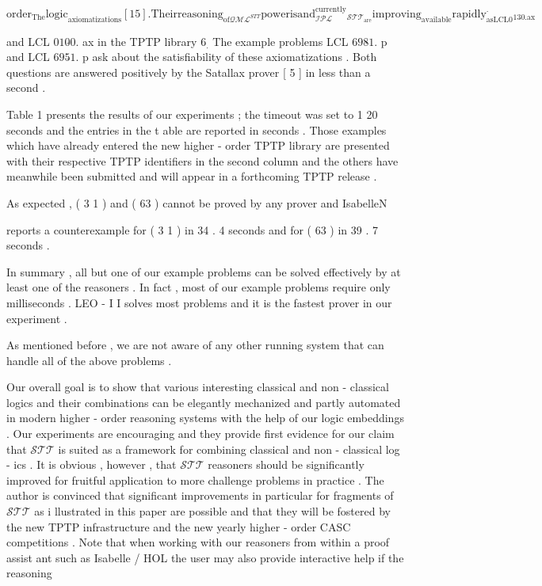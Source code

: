 \documentclass[10pt]{article}
\begin{document}
\[ \mathrm{order} _{ \mathrm{The} } \mathrm{logic} _{ \mathrm{axiomatizations} } [  1  5  ]  .   \mathrm{Their}   \mathrm{reasoning} _{ \mathrm{of}   \mathcal{QML} ^{ STT }} \mathrm{power}   \mathrm{is} { \mathrm{and} }_{ \mathcal{IPL} }^{ \mathrm{currently} }_{ \mathcal{STT} }_{ \mathrm{are} } \mathrm{improving} _{ \mathrm{available} } \mathrm{rapidly} _{ \mathrm{as}   \mathrm{LCL}  0 }^{ . }_{ 1  3  \hat{}  0  .  \mathrm{ax} }\]


\noindent and LCL  $ 0  1  0  \hat{}  0  . $  ax in the TPTP library  $ 6 _{ . }$  The example problems LCL  $ 698  \hat{}   1  . $  p and 
 LCL  $ 695  \hat{}  1  . $  p ask about the satisfiability of these axiomatizations . Both questions 
 are answered positively by the Satallax prover [ 5 ] in less than a second . 

Table 1 presents the results of our experiments ; the timeout was set to 1 20 
 seconds and the entries in the t able are reported in seconds . Those examples 
 which have already entered the new higher - order TPTP library are presented 
 with their respective TPTP identifiers in the second column and the others have 
 meanwhile been submitted and will appear in a forthcoming TPTP release . 

\hspace*{\fill}As expected , \quad ( 3 1 ) and ( 63 ) cannot be proved by any prover and IsabelleN 

\noindent reports a counterexample for ( 3 1 ) in 34 . 4 seconds and for ( 63 ) in 39 . 7 seconds . 

In summary , all but one of our example problems can be solved effectively 
 by at least one of the reasoners . In fact , most of our example problems require 
 only milliseconds . LEO - I I solves most problems and it is the fastest prover in 
 our experiment . 

As mentioned before , we are not aware of any other running system that can 
 handle all of the above problems . 

  

\noindent Our overall goal is to show that various interesting classical and non - classical 
 logics and their combinations can be elegantly mechanized and partly automated 
 in modern higher - order reasoning systems with the help of our logic embeddings . 
 Our experiments are encouraging and they provide first evidence for our claim 
 that  $ \mathcal{STT} $  is suited as a framework for combining classical and non - classical log - 
 ics . It is obvious , however , that  $ \mathcal{STT} $  reasoners should be significantly improved 
 for fruitful application to more challenge problems in practice . The author is 
 convinced that significant improvements \quad in particular for fragments of  $ \mathcal{STT} $  
 as i llustrated in this paper \quad are possible and that they will be fostered by the 
 new TPTP infrastructure and the new yearly higher - order CASC competitions . 
 Note that when working with our reasoners from within a proof assist ant 
 such as Isabelle / HOL the user may also provide interactive help if the reasoning 
\end{document}
